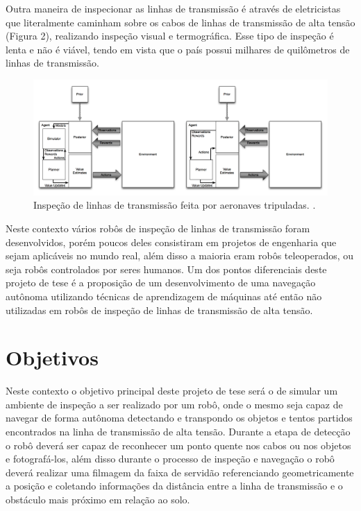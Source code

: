 Outra maneira de inspecionar as linhas de transmissão é através de eletricistas que literalmente caminham sobre os cabos de linhas de transmissão de alta tensão (Figura 2), realizando inspeção visual e termográfica. Esse tipo de inspeção é lenta e não é viável, tendo em vista que o país possui milhares de quilômetros de linhas de transmissão.
\begin{figure} [h!]												%
	\centering													%
	\includegraphics[width=1.0\textwidth]{./asmuth}				%
	\caption{Inspeção de linhas de transmissão feita por aeronaves tripuladas. \cite{asm:13}.}			%
	\label{asmuth}												%
\end{figure}													%

Neste contexto vários robôs de inspeção de linhas de transmissão foram desenvolvidos, porém poucos deles consistiram em projetos de engenharia que sejam aplicáveis no mundo real, além disso a maioria eram robôs teleoperados, ou seja robôs controlados por seres humanos. Um dos pontos diferenciais deste projeto de tese é a proposição de um desenvolvimento de uma navegação autônoma utilizando técnicas de aprendizagem de máquinas até então não utilizadas em robôs de inspeção de linhas de transmissão de alta tensão.

\section{Objetivos}
Neste contexto o objetivo principal deste projeto de tese será o de simular um ambiente de inspeção a ser realizado por um robô, onde o mesmo seja capaz de navegar de forma autônoma detectando e transpondo os objetos e tentos partidos encontrados na linha de transmissão de alta tensão. Durante a etapa de detecção o robô deverá ser capaz de reconhecer um ponto quente nos cabos ou nos objetos e fotografá-los, além disso durante o processo de inspeção e navegação o robô deverá realizar uma filmagem da faixa de servidão referenciando geometricamente a posição e coletando informações da distância entre a linha de transmissão e o obstáculo mais próximo em relação ao solo.


